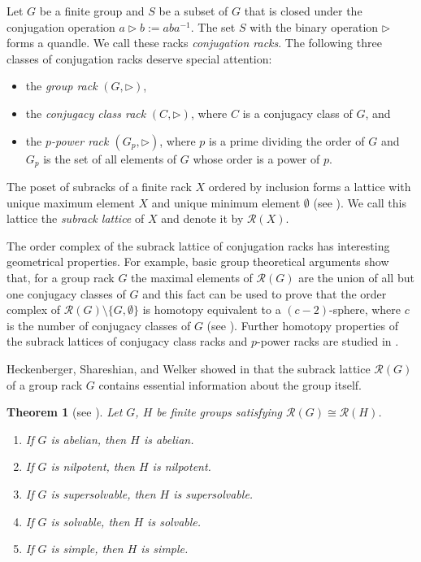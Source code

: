 \documentclass[a4paper,12pt]{article}
\newtheorem{thm}{Theorem}
\theoremstyle{definition}
\theoremstyle{remark}
\begin{document}
Let $G$ be a finite group and $S$ be a subset of $G$ that is closed under the conjugation operation $a\triangleright b := aba^{-1}$. The set $S$ with the binary operation $\triangleright$ forms a quandle. We call these racks \emph{conjugation racks}. The following three classes of conjugation racks deserve special attention:
\begin{itemize}
\item the \emph{group rack} $(G,\triangleright)$,
\item the \emph{conjugacy class rack} $(C,\triangleright)$, where $C$ is a conjugacy class of $G$, and
\item the \emph{$p$-power rack $(G_p,\triangleright)$}, where $p$ is a prime dividing the order of $G$ and $G_p$ is the set of all elements of $G$ whose order is a power of $p$.
\end{itemize}

The poset of subracks of a finite rack $X$ ordered by inclusion forms a lattice with unique maximum element $X$ and unique minimum element $\emptyset$ (see \cite[Lemma~2.1]{HSW19}). We call this lattice the \emph{subrack lattice} of $X$ and denote it by $\mathcal{R}(X)$.


The order complex of the subrack lattice of conjugation racks has interesting geometrical properties. For example, basic group theoretical arguments show that, for a group rack $G$ the maximal elements of $\mathcal{R}(G)$ are the union of all but one conjugacy classes of $G$ and this fact can be used to prove that the order complex of $\mathcal{R}(G)\setminus \{G,\emptyset\}$ is homotopy equivalent to a $(c-2)$-sphere, where $c$ is the number of conjugacy classes of $G$ (see \cite[Proposition~1.3]{HSW19}). Further homotopy properties of the subrack lattices of conjugacy class racks and $p$-power racks are studied in \cite{Kay26a,Kay26b}.

Heckenberger, Shareshian, and Welker showed in \cite{HSW19} that the subrack lattice $\mathcal{R}(G)$ of a group rack $G$ contains essential information about the group itself.

\begin{thm}[see {\cite[Theorem~1.1]{HSW19}}]\label{thm:1.1}
  Let $G$, $H$ be ﬁnite groups satisfying $\mathcal{R}(G)\cong \mathcal{R}(H)$.
  \begin{enumerate}
  \item If $G$ is abelian, then $H$ is abelian.
  \item If $G$ is nilpotent, then $H$ is nilpotent.
  \item If $G$ is supersolvable, then $H$ is supersolvable.
  \item If $G$ is solvable, then $H$ is solvable.
  \item If $G$ is simple, then $H$ is simple.
  \end{enumerate}
\end{thm}
\end{document}
